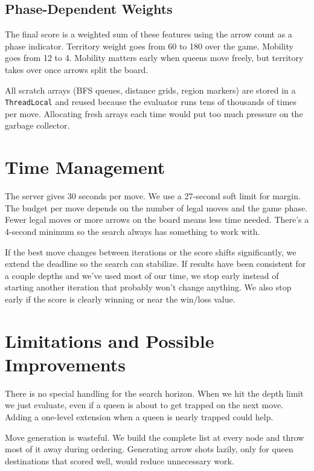 \documentclass[12pt, letterpaper]{article}
\begin{document}
\subsection{Phase-Dependent Weights}

The final score is a weighted sum of these features using the arrow count as a phase indicator. Territory weight goes from 60 to 180 over the game. Mobility goes from 12 to 4. Mobility matters early when queens move freely, but territory takes over once arrows split the board.

All scratch arrays (BFS queues, distance grids, region markers) are stored in a \texttt{ThreadLocal} and reused because the evaluator runs tens of thousands of times per move. Allocating fresh arrays each time would put too much pressure on the garbage collector.


\section{Time Management}

The server gives 30 seconds per move. We use a 27-second soft limit for margin. The budget per move depends on the number of legal moves and the game phase. Fewer legal moves or more arrows on the board means less time needed. There's a 4-second minimum so the search always has something to work with.

If the best move changes between iterations or the score shifts significantly, we extend the deadline so the search can stabilize. If results have been consistent for a couple depths and we've used most of our time, we stop early instead of starting another iteration that probably won't change anything. We also stop early if the score is clearly winning or near the win/loss value.


\section{Limitations and Possible Improvements}

There is no special handling for the search horizon. When we hit the depth limit we just evaluate, even if a queen is about to get trapped on the next move. Adding a one-level extension when a queen is nearly trapped could help.

Move generation is wasteful. We build the complete list at every node and throw most of it away during ordering. Generating arrow shots lazily, only for queen destinations that scored well, would reduce unnecessary work.
\end{document}
